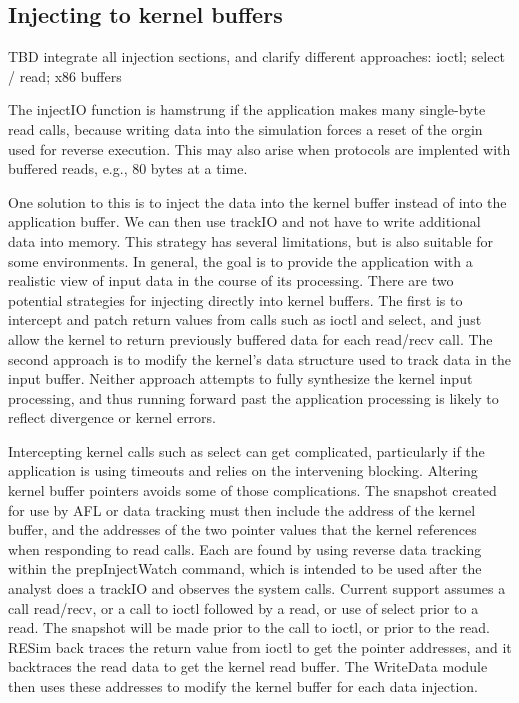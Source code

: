 \documentclass[titlepage]{article}
\begin{document}
\begin{appendices}
\section{Injecting to kernel buffers}
TBD integrate all injection sections, and clarify different approaches: ioctl; select / read; x86 buffers

The injectIO function is hamstrung if the application makes many single-byte read calls, because writing data into the
simulation forces a reset of the orgin used for reverse execution.  This may also arise when protocols are implented
with buffered reads, e.g., 80 bytes at a time.

One solution to this is to inject the data into the kernel buffer instead of into the application buffer.
We can then use trackIO and not have to write additional data into memory.  This strategy has several limitations, but
is also suitable for some environments.  In general, the goal is to provide the application with a realistic view of
input data in the course of its processing.  There are two potential strategies for injecting directly into kernel buffers.
The first is to intercept and patch return values from calls such as ioctl and select, and just allow the kernel to 
return previously buffered data for each read/recv call.  The second approach is to modify the kernel's data structure
used to track data in the input buffer.  Neither approach attempts to fully synthesize the kernel input processing, and thus
running forward past the application processing is likely to reflect divergence or kernel errors.

Intercepting kernel calls such as select can get complicated, particularly if the application is using timeouts and relies
on the intervening blocking.  Altering kernel buffer pointers avoids some of those complications.  The snapshot created
for use by AFL or data tracking must then include the address of the kernel buffer, and the addresses of the two pointer
values that the kernel references when responding to read calls.  Each are found by using reverse data tracking within the
prepInjectWatch command, which is intended to be used after the analyst does a trackIO and observes the system calls.
Current support assumes a call read/recv, or a call to ioctl followed by a read, or use of select prior to a read.  The snapshot will be made prior to the call to ioctl, or
prior to the read.  RESim
back traces the return value from ioctl to get the pointer addresses, and it backtraces the read data to get the kernel
read buffer.  The WriteData module then uses these addresses to modify the kernel buffer for each data injection.



\end{appendices}
\end{document}
